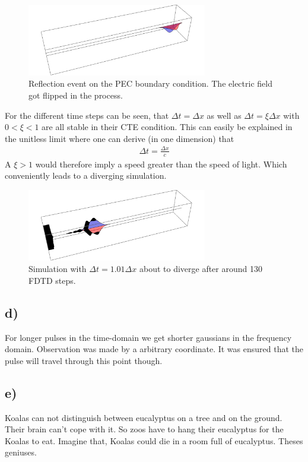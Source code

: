 \documentclass[12pt,a4paper]{article}
\begin{document}
		\begin{figure}[H]
			\centering
			\includegraphics[width=0.7\textwidth]{A2/data/A2b_Crash_5.png}
			\caption[]{Reflection event on the PEC boundary condition. The electric field got flipped in the process.}
		\end{figure}
		For the different time steps can be seen, that \(\Delta t=\Delta x\) as well as \(\Delta t=\xi\Delta x\)
		with \(0<\xi<1\) are all stable in their CTE condition. This can easily be explained in the
		unitless limit where one can derive (in one dimension) that
		\begin{align}
			\Delta t=\frac{\Delta x}{c}
		\end{align}
		A \(\xi > 1\) would therefore imply a speed greater than the speed of light.
		Which conveniently leads to a diverging simulation.
		\begin{figure}[H]
			\centering
			\includegraphics[width=0.7\textwidth]{A2/data/A2c.png}
			\caption[]{Simulation with \(\Delta t=1.01\Delta x\) about to diverge after around
			130 FDTD steps.}
		\end{figure}

	\subsection*{d)}
	For longer pulses in the time-domain we get shorter gaussians in the frequency domain.
	Observation was made by a arbitrary coordinate. It was ensured that the pulse will travel through
	this point though.

	\subsection*{e)}
	Koalas can not distinguish between eucalyptus on a tree and on the ground. Their brain can't cope
	with it. So zoos have to hang their eucalyptus for the Koalas to eat. Imagine that, Koalas could
	die in a room full of eucalyptus. Theses geniuses.
\end{document}
